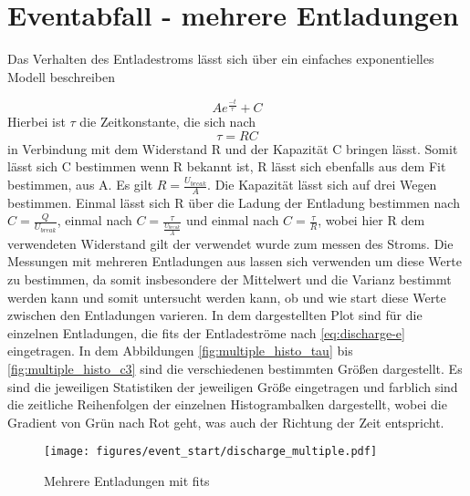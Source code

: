 \section{Eventabfall - mehrere Entladungen}
Das Verhalten des Entladestroms lässt sich über ein einfaches exponentielles Modell beschreiben

\begin{equation}
    Ae^{\frac{-t}{\tau}} + C
    \label{eq:discharge-e}
\end{equation}
Hierbei ist \(\tau\) die Zeitkonstante, die sich nach
\begin{equation}
    \tau = RC
\end{equation} 
in Verbindung mit dem Widerstand R und der Kapazität C bringen lässt. Somit lässt sich C bestimmen wenn R bekannt ist, R lässt sich ebenfalls aus dem Fit bestimmen, aus A. Es gilt \(R = \frac{U_{break}}{A}\). Die Kapazität lässt sich auf drei Wegen bestimmen. Einmal lässt sich R über die Ladung der Entladung bestimmen nach \(C = \frac{Q}{U_{break}}\), einmal nach \(C = \frac{\tau}{\frac{U_{break}}{A}}\) und einmal nach \(C = \frac{\tau}{R}\), wobei hier R dem verwendeten Widerstand gilt der verwendet wurde zum messen des Stroms. 
Die Messungen mit mehreren Entladungen aus  lassen sich verwenden um diese Werte zu bestimmen, da somit insbesondere der Mittelwert und die Varianz bestimmt werden kann und somit untersucht werden kann, ob und wie start diese Werte zwischen den Entladungen varieren. In dem dargestellten Plot sind für die einzelnen Entladungen, die fits der Entladeströme nach \eqref{eq:discharge-e} eingetragen. In dem Abbildungen \ref{fig:multiple_histo_tau} bis \ref{fig:multiple_histo_c3} sind die verschiedenen bestimmten Größen dargestellt. Es sind die jeweiligen Statistiken der jeweiligen Größe eingetragen und farblich sind die zeitliche Reihenfolgen der einzelnen Histogrambalken dargestellt, wobei die Gradient von Grün nach Rot geht, was auch der Richtung der Zeit entspricht.

\begin{figure}[htbp]
    \centering
    \begin{minipage}[t]
      \centering
      \texttt{[image: figures/event\_start/discharge\_multiple.pdf]}
      \caption{Mehrere Entladungen mit fits}
      \label{fig:discharge_multiple_fit}
    \end{minipage}
\end{figure}


